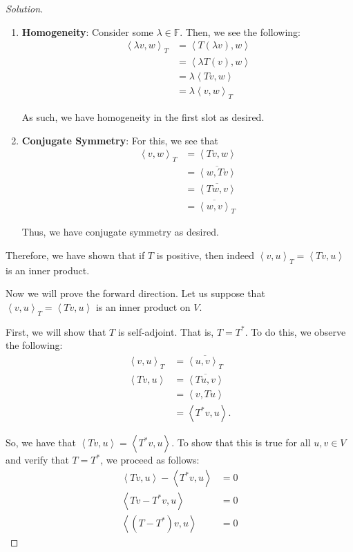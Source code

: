 \documentclass{article}
\newenvironment{solution}{\begin{proof}[Solution]}{\end{proof}}
\newcommand{\innerproduct}[2]{\left\langle{#1}, {#2}\right\rangle}
\begin{document}
\begin{solution}
\begin{enumerate}
		\item \textbf{Homogeneity}: Consider some $\lambda \in \mathbb{F}$. Then, we see the following:
		\begin{align*}
			\innerproduct{\lambda v}{w}_{T} &= \innerproduct{T(\lambda v)}{w} \\
			&= \innerproduct{\lambda T(v)}{w} \\
			&= \lambda \innerproduct{Tv}{w} \\
			&= \lambda \innerproduct{v}{w}_{T}
		\end{align*}
	
		As such, we have homogeneity in the first slot as desired.
	
		\item \textbf{Conjugate Symmetry}: For this, we see that
		\begin{align*}
			\innerproduct{v}{w}_{T} &= \innerproduct{Tv}{w} \\
			&= \overline{\innerproduct{w}{Tv}} \\
			&= \overline{\innerproduct{Tw}{v}} \\
			&= \overline{\innerproduct{w}{v}}_{T}
		\end{align*}
	
		Thus, we have conjugate symmetry as desired.
	\end{enumerate}

	Therefore, we have shown that if $T$ is positive, then indeed $\innerproduct{v}{u}_{T} = \innerproduct{Tv}{u}$ is an inner product.
	
	Now we will prove the forward direction. Let us suppose that $\innerproduct{v}{u}_{T} = \innerproduct{Tv}{u}$ is an inner product on $V$. 
	
	First, we will show that $T$ is self-adjoint. That is, $T = T^{*}$. To do this, we observe the following:
	\begin{align*}
		\innerproduct{v}{u}_{T} &= \overline{\innerproduct{u}{v}_{T}} \\
		\innerproduct{Tv}{u} &= \overline{\innerproduct{Tu}{v}} \\
		&= \innerproduct{v}{Tu} \\
		&= \innerproduct{T^{*}v}{u}.
	\end{align*}

	So, we have that $\innerproduct{Tv}{u} = \innerproduct{T^{*}v}{u}$. To show that this is true for all $u,v \in V$ and verify that $T = T^{*}$, we proceed as follows:
	\begin{align*}
		\innerproduct{Tv}{u} - \innerproduct{T^{*}v}{u} &= 0 \\
		\innerproduct{Tv - T^{*}v}{u} &= 0 \\
		\innerproduct{(T-T^{*})v}{u} &= 0
	\end{align*}


\end{solution}
\end{document}
